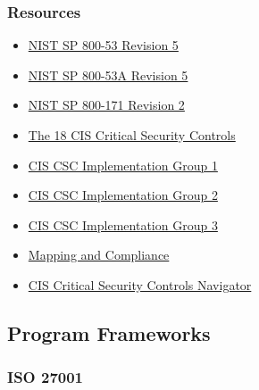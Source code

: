 \documentclass[12pt]{article}
\begin{document}
                               \subsubsection{Resources}                       
                                        \begin{itemize}
                                               \item \href{https://nvlpubs.nist.gov/nistpubs/SpecialPublications/NIST.SP.800-53r5.pdf}{NIST SP 800-53 Revision 5}
                                               \item \href{https://nvlpubs.nist.gov/nistpubs/SpecialPublications/NIST.SP.800-53Ar5.pdf}{NIST SP 800-53A Revision 5}
                                               \item \href{https://nvlpubs.nist.gov/nistpubs/SpecialPublications/NIST.SP.800-171r2.pdf}{NIST SP 800-171 Revision 2}
                                               \item \href{https://www.cisecurity.org/controls/cis-controls-list}{The 18 CIS Critical Security Controls}
                                               \item \href{https://www.cisecurity.org/controls/implementation-groups/ig1}{CIS CSC Implementation Group 1}
                                               \item \href{https://www.cisecurity.org/controls/implementation-groups/ig2}{CIS CSC Implementation Group 2}
                                               \item \href{https://www.cisecurity.org/controls/implementation-groups/ig3}{CIS CSC Implementation Group 3}
                                               \item \href{https://www.cisecurity.org/cybersecurity-tools/mapping-compliance}{Mapping and Compliance}
                                               \item \href{https://www.cisecurity.org/controls/cis-controls-navigator}{CIS Critical Security Controls Navigator}
                                               
                                        \end{itemize}
                \subsection{Program Frameworks}
                
                              \subsubsection{ISO 27001}
                              
\end{document}
